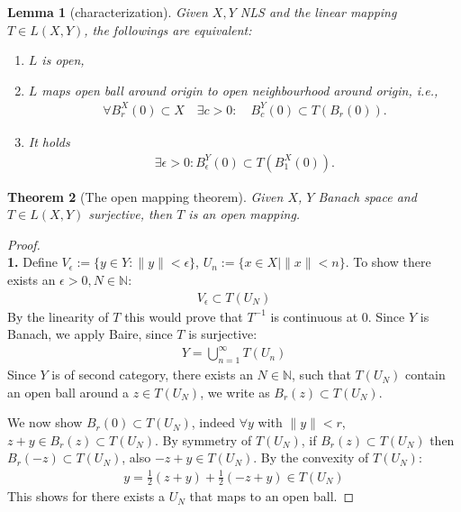 \documentclass[a4paper,11pt,fleqn]{book}
\newtheorem{theorem}{Theorem}[section]
\newtheorem{lemma}[theorem]{Lemma}
\theoremstyle{definition}
\theoremstyle{remark}
\begin{document}
\begin{lemma}[characterization]
	Given $X, Y$ NLS and the linear mapping $T \in L(X, Y)$, the followings are equivalent:
	\begin{enumerate}
		\item $L$ is open, 
		\item $L$ maps open ball around origin to open neighbourhood around origin, i.e., 
		\begin{align*}
			\forall B^X_r(0) \subset X \quad \exists c>0: \quad B^Y_c(0) \subset T(B_r(0)). 
		\end{align*}
		\item It holds
		\begin{align*}
			\exists \epsilon > 0: B_\epsilon^Y(0) \subset T(B_1^X(0)).
		\end{align*}
	\end{enumerate}
\end{lemma}

\begin{theorem}[The open mapping theorem]
	Given $X$, $Y$ Banach space and $T\in L(X,Y)$ surjective, then $T$ is an open mapping.
\end{theorem}
\begin{proof}\quad\\
\textbf{1.} Define $V_\epsilon:= \{y \in Y: \|y\| < \epsilon\}$, $U_n := \{x \in X| \|x\| < n\}$.  To show there exists an $\epsilon > 0, N \in \mathbb{N}:$
\begin{align*}
	V_\epsilon \subset T(U_N)
\end{align*}
By the linearity of $T$ this would prove that $T^{-1}$ is continuous at 0. 
Since $Y$ is Banach, we apply Baire, since $T$ is surjective:
\begin{align*}
	Y = \bigcup_{n = 1}^\infty T(U_n)
\end{align*}
Since $Y$ is of second category, there exists an $N \in \mathbb{N}$, such that $T(U_N)$ contain an open ball around a $z \in T(U_N)$, we write as $B_r(z) \subset T(U_N)$.\par
We now show $B_r(0) \subset T(U_N)$, indeed $\forall y$ with $\|y\| < r$, $z+y \in B_r(z) \subset T(U_N)$. By symmetry of $T(U_N)$, if $B_r(z) \subset T(U_N)$ then $B_r(-z) \subset T(U_N)$, also $-z + y \in T(U_N)$. By the convexity of $T(U_N)$:
\begin{align*}
	y= \frac{1}{2}(z + y) + \frac{1}{2}(-z + y) \in T(U_N)
\end{align*}
	This shows for there exists a $U_N$ that maps to an open ball. 
\end{proof}
\end{document}

